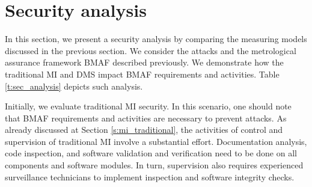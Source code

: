 \documentclass[journal]{IEEEtran}
\begin{document}

\section{Security analysis}
\label{s:sec_analysis}
In this section, we present a security analysis by comparing the measuring models discussed in the previous section.
We consider the attacks and the metrological assurance framework BMAF described previously.
We demonstrate how the traditional MI and DMS impact BMAF requirements and activities.  
Table \ref{t:sec_analysis} depicts such analysis.

Initially, we evaluate traditional MI security. 
In this scenario, one should note that BMAF requirements and activities are necessary to prevent attacks.
As already discussed at Section \ref{s:mi_traditional}, the activities of control and supervision of traditional MI involve a substantial effort.
Documentation analysis, code inspection, and software validation and verification need to be done on all components and software modules.
In turn, supervision also requires experienced surveillance technicians to implement inspection and software integrity checks.
\end{document}
